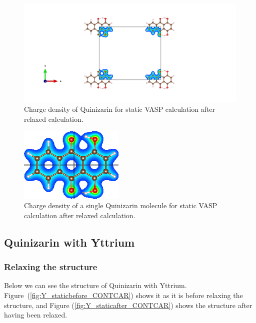 \documentclass{article}
\begin{document}
      \begin{figure}[H]
        \centering
        \includegraphics[width = \textwidth]{../fig/basic_staticafter_CHGCAR.png}
        \caption{Charge density of Quinizarin for static VASP calculation after relaxed calculation. }
        \label{fig:basic_staticafter_CHGCAR}
      \end{figure}

      \begin{figure}[H]
        \centering
        \includegraphics[width = 5cm]{../fig/basic_staticafter_CHGDENSITY.png}
        \caption{Charge density of a single Quinizarin molecule for static VASP calculation after relaxed calculation. }
        \label{fig:basic_staticafter_CHGDENSITY}
      \end{figure}

      \vspace{1cm}

  \subsection{Quinizarin with Yttrium}

    \subsubsection{Relaxing the structure}

      Below we can see the structure of Quinizarin with Yttrium. Figure~(\ref{fig:Y_staticbefore_CONTCAR}) shows it as it is before relaxing the structure, and Figure (\ref{fig:Y_staticafter_CONTCAR}) shows the structure after having been relaxed. \\
\end{document}
